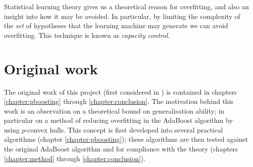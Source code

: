 Statistical learning theory gives us a theoretical reason for
overfitting, and also an insight into how it may be avoided.  In
particular, by limiting the complexity of the \emph{set} of hypotheses
that the learning machine may generate we can avoid overfitting.  This
technique is known as \emph{capacity control}.


\section{Original work}

The original work of this project (first considered in
\cite{Williamson99}) is contained in chapters \ref{chapter:pboosting}
through \ref{chapter:conclusion}.  The motivation behind this work is
an observation on a theoretical bound on generalisation ability; in
particular on a method of reducing overfitting in the AdaBoost
algorithm by using $p$-convex hulls.  This concept is first developed
into several practical algorithms (chapter \ref{chapter:pboosting});
these algorithms are then tested against the original AdaBoost
algorithm and for compliance with the theory (chapters
\ref{chapter:method} through \ref{chapter:conclusion}). 





